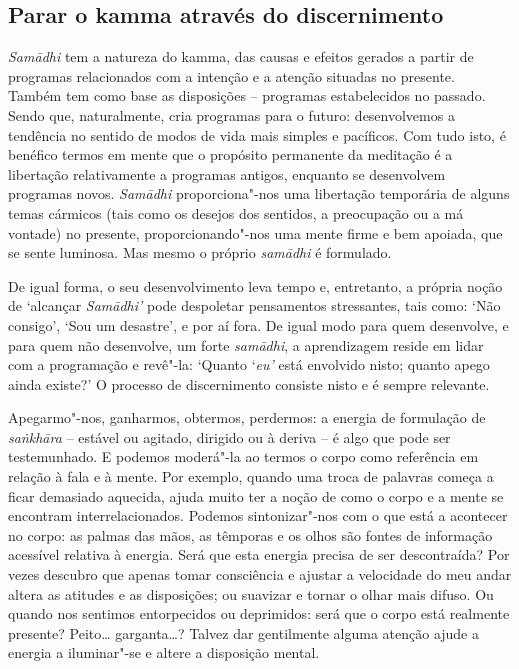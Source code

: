 \subsection{Parar o kamma através do discernimento}

\emph{Samādhi} tem a natureza do kamma, das causas e efeitos gerados a partir de
programas relacionados com a intenção e a atenção situadas no presente. Também
tem como base as disposições -- programas estabelecidos no passado. Sendo que,
naturalmente, cria programas para o futuro: desenvolvemos a tendência no sentido
de modos de vida mais simples e pacíficos. Com tudo isto, é benéfico termos em
mente que o propósito permanente da meditação é a libertação relativamente a
programas antigos, enquanto se desenvolvem programas novos. \emph{Samādhi}
proporciona"-nos uma libertação temporária de alguns temas cármicos (tais como os
desejos dos sentidos, a preocupação ou a má vontade) no presente,
proporcionando"-nos uma mente firme e bem apoiada, que se sente luminosa. Mas
mesmo o próprio \emph{samādhi} é formulado.

\enlargethispage{\baselineskip}

De igual forma, o seu desenvolvimento leva tempo e, entretanto, a própria noção
de `alcançar \emph{Samādhi'} pode despoletar pensamentos stressantes, tais como:
`Não consigo', `Sou um desastre', e por aí fora. De igual modo para quem
desenvolve, e para quem não desenvolve, um forte \emph{samādhi}, a aprendizagem
reside em lidar com a programação e revê"-la: `Quanto `\emph{eu'} está envolvido
nisto; quanto apego ainda existe?' O processo de discernimento consiste nisto e
é sempre relevante.

Apegarmo"-nos, ganharmos, obtermos, perdermos: a energia de formulação de
\emph{saṅkhāra} -- estável ou agitado, dirigido ou à deriva -- é algo que pode
ser testemunhado. E podemos moderá"-la ao termos o corpo como referência em
relação à fala e à mente. Por exemplo, quando uma troca de palavras começa a
ficar demasiado aquecida, ajuda muito ter a noção de como o corpo e a mente se
encontram interrelacionados. Podemos sintonizar"-nos com o que está a acontecer
no corpo: as palmas das mãos, as têmporas e os olhos são fontes de informação
acessível relativa à energia. Será que esta energia precisa de ser descontraída?
Por vezes descubro que apenas tomar consciência e ajustar a velocidade do meu
andar altera as atitudes e as disposições; ou suavizar e tornar o olhar mais
difuso. Ou quando nos sentimos entorpecidos ou deprimidos: será que o corpo está
realmente presente? Peito\ldots{} garganta\ldots{}? Talvez dar gentilmente alguma atenção
ajude a energia a iluminar"-se e altere a disposição mental.

